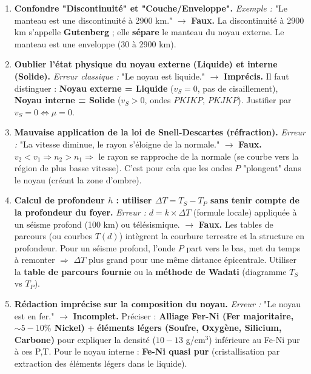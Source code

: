 \documentclass[11pt]{article}
\begin{document}
\begin{attention}
\begin{enumerate}
    \item \textbf{Confondre "Discontinuité" et "Couche/Enveloppe".} \emph{Exemple :} "Le manteau est une discontinuité à 2900 km." $\rightarrow$ \textbf{Faux.} La discontinuité à 2900 km s'appelle \textbf{Gutenberg} ; elle \textbf{sépare} le manteau du noyau externe. Le manteau est une enveloppe (30 à 2900 km).
    \item \textbf{Oublier l'état physique du noyau externe (Liquide) et interne (Solide).} \emph{Erreur classique :} "Le noyau est liquide." $\rightarrow$ \textbf{Imprécis.} Il faut distinguer : \textbf{Noyau externe = Liquide} ($v_S=0$, pas de cisaillement), \textbf{Noyau interne = Solide} ($v_S>0$, ondes $PKIKP$, $PKJKP$). Justifier par $v_S=0 \Leftrightarrow \mu=0$.
    \item \textbf{Mauvaise application de la loi de Snell-Descartes (réfraction).} \emph{Erreur :} "La vitesse diminue, le rayon s'éloigne de la normale." $\rightarrow$ \textbf{Faux.} $v_2 < v_1 \Rightarrow n_2 > n_1 \Rightarrow$ le rayon se rapproche de la normale (se courbe vers la région de plus basse vitesse). C'est pour cela que les ondes $P$ "plongent" dans le noyau (créant la zone d'ombre).
    \item \textbf{Calcul de profondeur $h$ : utiliser $\Delta T = T_S - T_P$ sans tenir compte de la profondeur du foyer.} \emph{Erreur :} $d = k \times \Delta T$ (formule locale) appliquée à un séisme profond (100 km) ou télésismique. $\rightarrow$ \textbf{Faux.} Les tables de parcours (ou courbes $T(d)$) intègrent la courbure terrestre et la structure en profondeur. Pour un séisme profond, l'onde $P$ part vers le bas, met du temps à remonter $\Rightarrow$ $\Delta T$ plus grand pour une même distance épicentrale. Utiliser la \textbf{table de parcours fournie} ou la \textbf{méthode de Wadati} (diagramme $T_S$ vs $T_P$).
    \item \textbf{Rédaction imprécise sur la composition du noyau.} \emph{Erreur :} "Le noyau est en fer." $\rightarrow$ \textbf{Incomplet.} Préciser : \textbf{Alliage Fer-Ni (Fer majoritaire, $\sim 5-10\%$ Nickel)} + \textbf{éléments légers (Soufre, Oxygène, Silicium, Carbone)} pour expliquer la densité ($10-13$ g/cm$^3$) inférieure au Fe-Ni pur à ces P,T. Pour le noyau interne : \textbf{Fe-Ni quasi pur} (cristallisation par extraction des éléments légers dans le liquide).
\end{enumerate}
\end{attention}
\end{document}
